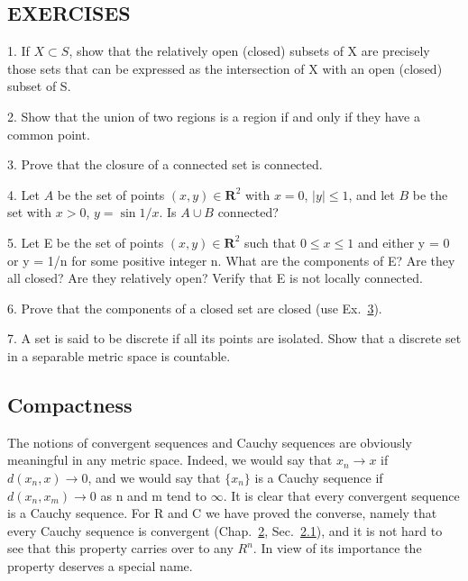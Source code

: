 \subsection*{EXERCISES}
1. If $X \subset S$, show that the relatively open (closed) subsets of X are precisely those sets that can be expressed as the intersection of X with an open (closed) subset of S.

2. Show that the union of two regions is a region if and only if they have a common point.

3. Prove that the closure of a connected set is connected.

4. Let $A$ be the set of points $(x, y) \in \mathbf{R}^2$ with $x = 0$, $|y| \leq 1$, and let $B$ be the set with $x > 0$, $y = \sin 1/x$. Is $A \cup B$ connected?

5. Let E be the set of points $(x,y) \in \mathbf{R}^{2}$ such that $0 \leq x \leq 1$ and either y = 0 or y = 1/n for some positive integer n. What are the components of E? Are they all closed? Are they relatively open? Verify that E is not locally connected.

6. Prove that the components of a closed set are closed (use Ex.~\hyperref[exercise:3.1.3.2.3]{3}).

7. A set is said to be discrete if all its points are isolated. Show that a discrete set in a separable metric space is countable.


\setcounter{section}{1}\setcounter{subsection}{3}\subsection{Compactness}\label{sec:3.1.4}
The notions of convergent sequences and Cauchy sequences are obviously meaningful in any metric space. Indeed, we would say that $x_{n} \rightarrow x$ if $d(x_{n}, x) \rightarrow 0$, and we would say that $\{x_{n}\}$ is a Cauchy sequence if $d(x_{n}, x_{m}) \rightarrow 0$ as n and m tend to $\infty$. It is clear that every convergent sequence is a Cauchy sequence. For R and C we have proved the converse, namely that every Cauchy sequence is convergent (Chap.~\hyperref[chap:2]{2}, Sec.~\hyperref[sec:2.2.1]{2.1}), and it is not hard to see that this property carries over to any $R^{n}$. In view of its importance the property deserves a special name.

